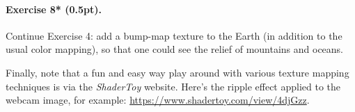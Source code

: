 \documentclass{article}
\newenvironment{exercise}[2]{\paragraph{Exercise #1 (#2pt).} }{
\medskip}
\begin{document}
\begin{exercise}{8*}{0.5}
Continue Exercise 4: add a bump-map texture to the Earth (in addition to the usual color mapping), so that one could see the relief of mountains and oceans.
\end{exercise}

Finally, note that a fun and easy way play around with various texture mapping techniques is via the \emph{ShaderToy} website. Here's the ripple effect applied to the webcam image, for example: \url{https://www.shadertoy.com/view/4djGzz}.
\end{document}
